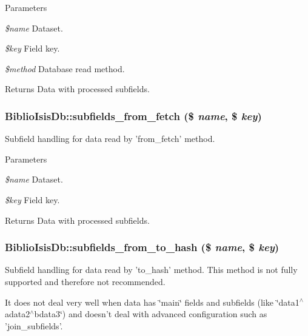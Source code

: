 \begin{DoxyParams}{Parameters}
\item[{\em \$name}]Dataset.\item[{\em \$key}]Field key.\item[{\em \$method}]Database read method.\end{DoxyParams}
\begin{DoxyReturn}{Returns}
Data with processed subfields. 
\end{DoxyReturn}
\hypertarget{classBiblioIsisDb_a2b08c6a7ba20f6f5eb07edb2b4a914c1}{
\subsubsection[{subfields\_\-from\_\-fetch}]{\setlength{\rightskip}{0pt plus 5cm}BiblioIsisDb::subfields\_\-from\_\-fetch (\$ {\em name}, \/  \$ {\em key})}}
\label{classBiblioIsisDb_a2b08c6a7ba20f6f5eb07edb2b4a914c1}
Subfield handling for data read by 'from\_\-fetch' method.


\begin{DoxyParams}{Parameters}
\item[{\em \$name}]Dataset.\item[{\em \$key}]Field key.\end{DoxyParams}
\begin{DoxyReturn}{Returns}
Data with processed subfields. 
\end{DoxyReturn}
\hypertarget{classBiblioIsisDb_a8c6a0081c5296a6db520e98998502ef7}{
\subsubsection[{subfields\_\-from\_\-to\_\-hash}]{\setlength{\rightskip}{0pt plus 5cm}BiblioIsisDb::subfields\_\-from\_\-to\_\-hash (\$ {\em name}, \/  \$ {\em key})}}
\label{classBiblioIsisDb_a8c6a0081c5296a6db520e98998502ef7}
Subfield handling for data read by 'to\_\-hash' method. This method is not fully supported and therefore not recommended.

It does not deal very well when data has \char`\"{}main\char`\"{} fields and subfields (like \char`\"{}data1$^\wedge$adata2$^\wedge$bdata3\char`\"{}) and doesn't deal with advanced configuration such as 'join\_\-subfields'.


